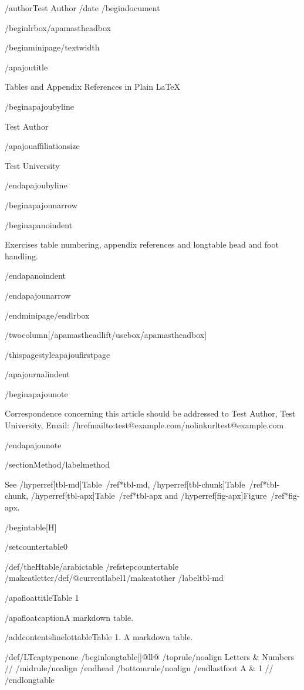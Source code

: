 /author{Test Author}
/date{}
/begin{document}


/begin{lrbox}{/apamastheadbox}%

/begin{minipage}{/textwidth}

/apajoutitle{

Tables and Appendix References in Plain LaTeX

}

/begin{apajoubyline}

Test Author

/apajouaffiliationsize

Test University

/end{apajoubyline}

/begin{apajounarrow}

/begin{apanoindent}

Exercises table numbering, appendix references and longtable head and
foot handling.

/end{apanoindent}

/end{apajounarrow}

/end{minipage}/end{lrbox}

/twocolumn[/apamastheadlift/usebox{/apamastheadbox}]

/thispagestyle{apajoufirstpage}

/apajournalindent

/begin{apajounote}

Correspondence concerning this article should be addressed to Test
Author, Test University, Email:
/href{mailto:test@example.com}{/nolinkurl{test@example.com}}

/end{apajounote}

/section{Method}/label{method}

See /hyperref[tbl-md]{Table~/ref*{tbl-md}},
/hyperref[tbl-chunk]{Table~/ref*{tbl-chunk}},
/hyperref[tbl-apx]{Table~/ref*{tbl-apx}} and
/hyperref[fig-apx]{Figure~/ref*{fig-apx}}.

/begin{table}[H]

/setcounter{table}{0}

/def/theHtable{/arabic{table}}%
/refstepcounter{table}%
/makeatletter/def/@currentlabel{1}/makeatother%
/label{tbl-md}

/apafloattitle{Table 1}

/apafloatcaption{A markdown table.}

/addcontentsline{lot}{table}{Table 1. A markdown table.}

{/def/LTcaptype{none} %
/begin{longtable}[]{@{}ll@{}}
/toprule/noalign{}
Letters & Numbers //
/midrule/noalign{}
/endhead
/bottomrule/noalign{}
/endlastfoot
A & 1 //
/end{longtable}
}


